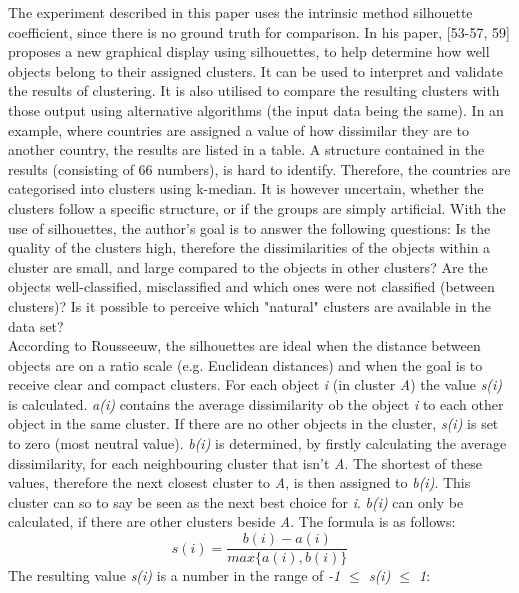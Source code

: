   The experiment described in this paper uses the intrinsic method silhouette coefficient, since there is no ground truth for comparison. 
  In his paper, \textcite{rousseeuw1987silhouettes}[53-57, 59] proposes a new graphical display using silhouettes, to help determine how well objects belong to their assigned clusters. It can be used to interpret and validate the results of clustering. It is also utilised to compare the resulting clusters with those output using alternative algorithms (the input data being the same). In an example, where countries are assigned a value of how dissimilar they are to another country, the results are listed in a table. A structure contained in the results (consisting of 66 numbers), is hard to identify. Therefore, the countries are categorised into clusters using k-median. It is however uncertain, whether the clusters follow a specific structure, or if the groups are simply artificial. With the use of silhouettes, the author's goal is to answer the following questions: Is the quality of the clusters high, therefore the dissimilarities of the objects within a cluster are small, and large compared to the objects in other clusters? Are the objects well-classified, misclassified and which ones were not classified (between clusters)? Is it possible to perceive which "natural" clusters are available in the data set? \\
  According to Rousseeuw, the silhouettes are ideal when the distance between objects are on a ratio scale (e.g. Euclidean distances) and when the goal is to receive clear and compact clusters. For each object \textit{i} (in cluster \textit{A}) the value \textit{s(i)} is calculated. \textit{a(i)} contains the average dissimilarity ob the object \textit{i} to each other object in the same cluster. If there are no other objects in the cluster, \textit{s(i)} is set to zero (most neutral value). \textit{b(i)} is determined, by firstly calculating the average dissimilarity, for each neighbouring cluster that isn't \textit{A}. The shortest of these values, therefore the next closest cluster to \textit{A}, is then assigned to \textit{b(i)}. This cluster can so to say be seen as the next best choice for \textit{i}. \textit{b(i)} can only be calculated, if there are other clusters beside \textit{A}.
  The formula is as follows:
  \[
    s(i) = \frac{b(i) - a(i)}{max\{a(i), b(i)\}}  
  \]
  The resulting value \textit{s(i)} is a number in the range of \textit{-1 $\leq$ \textit{s(i)} $\leq$ 1}:

